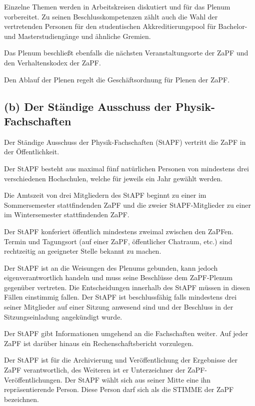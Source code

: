 \documentclass[12pt,oneside]{scrartcl}
\begin{document}
Einzelne Themen werden in Arbeitskreisen diskutiert und für das Plenum
vorbereitet. Zu seinen Beschlusskompetenzen zählt auch die Wahl der
vertretenden Personen für den studentischen Akkreditierungspool für Bachelor-
und Masterstudiengänge und ähnliche Gremien.

Das Plenum beschließt ebenfalls die nächsten Veranstaltungsorte der ZaPF und
den Verhaltenskodex der ZaPF.

Den Ablauf der Plenen regelt die Geschäftsordnung für Plenen der ZaPF.


\subsection{(b) Der Ständige Ausschuss der Physik-Fachschaften%
  \label{b-der-standige-ausschuss-der-physik-fachschaften}%
}

Der Ständige Ausschuss der Physik-Fachschaften (StAPF) vertritt die ZaPF in der
Öffentlichkeit.

Der StAPF besteht aus maximal fünf natürlichen Personen von mindestens drei
verschiedenen Hochschulen, welche für jeweils ein Jahr gewählt werden.

Die Amtszeit von drei Mitgliedern des StAPF beginnt zu einer im Sommersemester
stattfindenden ZaPF und die zweier StAPF-Mitglieder zu einer im Wintersemester
stattfindenden ZaPF.

Der StAPF konferiert öffentlich mindestens zweimal zwischen den ZaPFen.
Termin und Tagungsort (auf einer ZaPF, öffentlicher Chatraum, etc.) sind
rechtzeitig an geeigneter Stelle bekannt zu machen.

Der StAPF ist an die Weisungen des Plenums gebunden, kann jedoch
eigenverantwortlich handeln und muss seine Beschlüsse dem ZaPF-Plenum gegenüber
vertreten.
Die Entscheidungen innerhalb des StAPF müssen in diesen Fällen einstimmig fallen.
Der StAPF ist beschlussfähig falls mindestens drei seiner Mitglieder auf einer
Sitzung anwesend sind und der Beschluss in der Sitzungseinladung angekündigt
wurde.

Der StAPF gibt Informationen umgehend an die Fachschaften weiter.
Auf jeder ZaPF ist darüber hinaus ein Rechenschaftsbericht vorzulegen.

Der StAPF ist für die Archivierung und Veröffentlichung der Ergebnisse der ZaPF
verantwortlich, des Weiteren ist er Unterzeichner der ZaPF-Veröffentlichungen.
Der StAPF wählt sich aus seiner Mitte eine ihn repräsentierende Person. Diese
Person darf sich als die \textquotedbl{}STIMME der ZaPF\textquotedbl{} bezeichnen.
\end{document}
